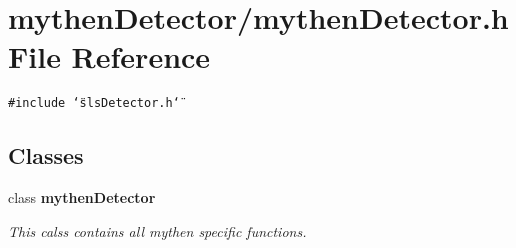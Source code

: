 \section{mythen\-Detector/mythen\-Detector.h File Reference}
\label{mythenDetector_8h}
{\tt \#include \char`\"{}sls\-Detector.h\char`\"{}}\par
\subsection*{Classes}
\begin{CompactItemize}
\item 
class \bf{mythen\-Detector}
\begin{CompactList}\small\item\em This calss contains all mythen specific functions. \item\end{CompactList}\end{CompactItemize}
